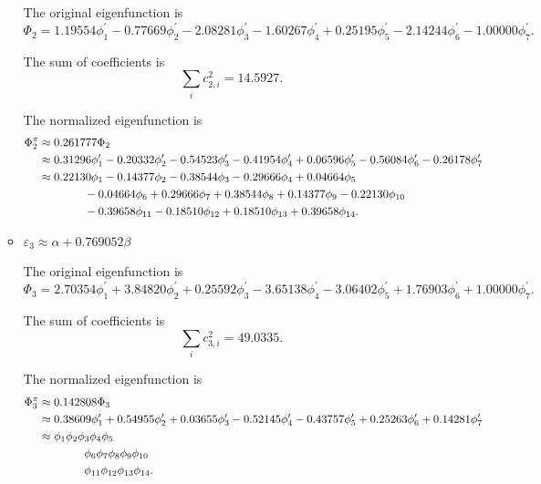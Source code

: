 \documentclass[a4paper]{book}
\begin{document}
\begin{solution}
\begin{enumerate}[label=(\alph*)]
\begin{itemize}
		The original eigenfunction is
		\begin{equation*}
			\Phi_2 = 1.19554 \phi^\prime_1 - 0.77669 \phi^\prime_2 -2.08281 \phi^\prime_3 -1.60267 \phi^\prime_4 +0.25195 \phi^\prime_5 - 2.14244 \phi^\prime_6 - 1.00000 \phi^\prime_7.
		\end{equation*}
		
		The sum of coefficients is
		\begin{equation*}
			\sum_{i} c^2_{2,i} = 14.5927.
		\end{equation*}

		The normalized eigenfunction is
		\begin{align}
			\Phi^\pi_2 &\approx 0.261777 \Phi_2 \notag \\
			&\approx 0.31296 \phi^\prime_1 - 0.20332 \phi^\prime_2 -0.54523 \phi^\prime_3 -0.41954 \phi^\prime_4 + 0.06596 \phi^\prime_5 - 0.56084 \phi^\prime_6 - 0.26178 \phi^\prime_7 \notag \\
			&\approx 0.22130 \phi_1 -0.14377 \phi_2 -0.38544 \phi_3 -0.29666 \phi_4 + 0.04664 \phi_5  \notag \\
			&\hspace*{4em} - 0.04664\phi_6 +0.29666 \phi_7 +0.38544 \phi_8 +0.14377 \phi_9  -0.22130 \phi_{10} \notag \\
			&\hspace*{4em}- 0.39658 \phi_{11} - 0.18510 \phi_{12} + 0.18510 \phi_{13} + 0.39658 \phi_{14} .
		\end{align}
		
		
		\item $\varepsilon_3 \approx \alpha + 0.769052 \beta$
		
		The original eigenfunction is
		\begin{equation*}
			\Phi_3 = 2.70354 \phi^\prime_1 + 3.84820 \phi^\prime_2 +0.25592 \phi^\prime_3 -3.65138 \phi^\prime_4 - 3.06402 \phi^\prime_5 + 1.76903 \phi^\prime_6 + 1.00000 \phi^\prime_7.
		\end{equation*}
		
		The sum of coefficients is
		\begin{equation*}
			\sum_{i} c^2_{3,i} = 49.0335.
		\end{equation*}
		
		The normalized eigenfunction is
		\begin{align}
			\Phi^\pi_3 &\approx 0.142808 \Phi_3 \notag \\
			&\approx 0.38609 \phi^\prime_1 + 0.54955 \phi^\prime_2 +0.03655 \phi^\prime_3 -0.52145 \phi^\prime_4 - 0.43757 \phi^\prime_5 + 0.25263 \phi^\prime_6 + 0.14281 \phi^\prime_7\\
			&\approx \phi_1  \phi_2 \phi_3 \phi_4 \phi_5  \notag \\
			&\hspace*{4em} \phi_6 \phi_7 \phi_8  \phi_9  \phi_{10} \notag \\
			&\hspace*{4em} \phi_{11}  \phi_{12} \phi_{13} \phi_{14} .
		\end{align}
		

\end{itemize}
\end{enumerate}
\end{solution}
\end{document}
